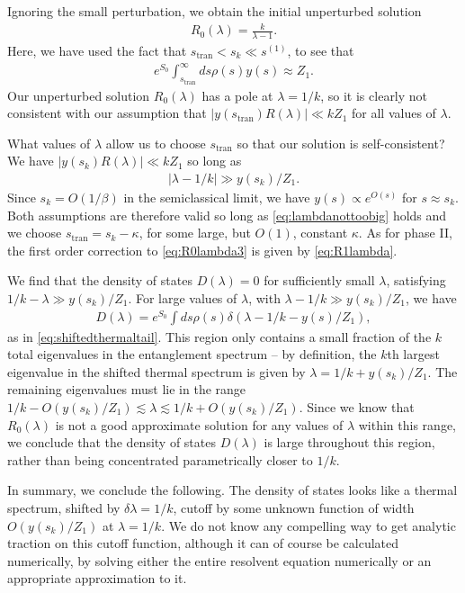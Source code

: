 \documentclass[12pt]{article}
\newcommand{\stran}{s_{\text{tran}}}
\newcommand{\smax}{s_k}
\numberwithin{equation}{section}
\begin{document}
Ignoring the small perturbation, we obtain the initial unperturbed solution
\begin{align} \label{eq:R0lambda3}
R_0 (\lambda) = \frac{k}{\lambda - 1}.
\end{align}
Here, we have used the fact that $\stran < \smax \ll s^{(1)}$, to see that
\begin{align}
e^{S_0} \int_{\stran}^\infty ds \rho(s) y(s)  \approx Z_1.
\end{align}
Our unperturbed solution $R_0(\lambda)$ has a pole at $\lambda = 1/k$, so it is clearly not consistent with our assumption that $|y(\stran) R(\lambda)| \ll k Z_1$ for all values of $\lambda$. 

What values of $\lambda$ allow us to choose $\stran$ so that our solution is self-consistent? We have  $|y(\smax) R(\lambda)| \ll k Z_1$ so long as
\begin{align} \label{eq:lambdanottoobig}
\left|\lambda - 1/k\right| \gg y(\smax)/Z_1.
\end{align}
Since $\smax = O(1/\beta)$ in the semiclassical limit, we have $y(s) \propto e^{O(s)}$  for $s \approx \smax$. Both assumptions are therefore valid so long as \eqref{eq:lambdanottoobig} holds and we choose $\stran =\smax - \kappa$, for some large, but $O(1)$, constant $\kappa$. As for phase II, the first order correction to \eqref{eq:R0lambda3} is given by \eqref{eq:R1lambda}. 

We find that the density of states $D(\lambda) = 0$ for sufficiently small $\lambda$, satisfying $1/k - \lambda \gg y(\smax)/Z_1$. For large values of $\lambda$, with $\lambda - 1/k \gg y(\smax)/Z_1$, we have
\begin{align}
D(\lambda) = e^{S_0} \int ds \rho(s) \delta( \lambda - 1/k - y(s)/ Z_1),
\end{align}
as in \eqref{eq:shiftedthermaltail}. This region only contains a small fraction of the $k$ total eigenvalues in the entanglement spectrum -- by definition, the $k$th largest eigenvalue in the shifted thermal spectrum is given by $ \lambda = 1/k + y(\smax)/Z_1$. The remaining eigenvalues must lie in the range $1/k - O(y(\smax)/Z_1) \lesssim \lambda \lesssim 1/k + O(y(\smax)/Z_1)$. Since we know that $R_0 (\lambda)$ is not a good approximate solution for any values of $\lambda$ within this range, we conclude that the density of states $D(\lambda)$ is large throughout this region, rather than being concentrated parametrically closer to $1/k$. 

In summary, we conclude the following. The density of states looks like a thermal spectrum, shifted by $\delta \lambda = 1/k$, cutoff by some unknown function of width $O(y(\smax)/Z_1)$ at $\lambda = 1/k$. We do not know any compelling way to get analytic traction on this cutoff function, although it can of course be calculated numerically, by solving either the entire resolvent equation numerically or an appropriate approximation to it. 
\end{document}
